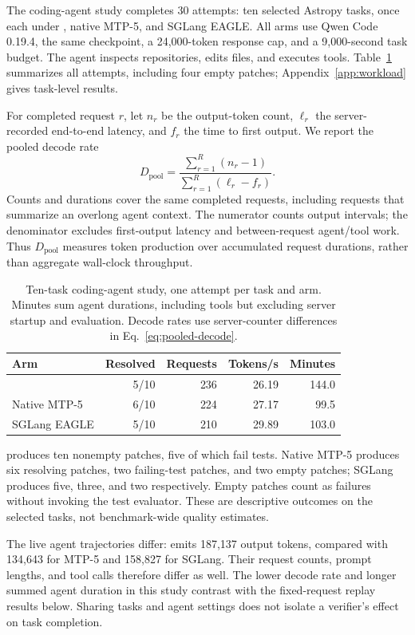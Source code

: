 The coding-agent study completes 30 attempts: ten selected Astropy tasks, once each under \sys{}, native MTP-5, and SGLang EAGLE. All arms use Qwen Code 0.19.4, the same checkpoint, a 24,000-token response cap, and a 9,000-second task budget. The agent inspects repositories, edits files, and executes tools. Table~\ref{tab:agent-study} summarizes all attempts, including four empty patches; Appendix~\ref{app:workload} gives task-level results.

For completed request $r$, let $n_r$ be the output-token count, $\ell_r$ the server-recorded end-to-end latency, and $f_r$ the time to first output. We report the pooled decode rate
\begin{equation}
 D_{\mathrm{pool}} =
 \frac{\sum_{r=1}^{R}(n_r-1)}{\sum_{r=1}^{R}(\ell_r-f_r)}.
 \label{eq:pooled-decode}
\end{equation}
Counts and durations cover the same completed requests, including requests that summarize an overlong agent context. The numerator counts output intervals; the denominator excludes first-output latency and between-request agent/tool work. Thus $D_{\mathrm{pool}}$ measures token production over accumulated request durations, rather than aggregate wall-clock throughput.

\begin{table}[t]
\caption{Ten-task coding-agent study, one attempt per task and arm. Minutes sum agent durations, including tools but excluding server startup and evaluation. Decode rates use server-counter differences in Eq.~\ref{eq:pooled-decode}.}
\label{tab:agent-study}
\centering\small
\setlength{\tabcolsep}{3pt}
\begin{tabular}{@{}lrrrr@{}}
\toprule
Arm & Resolved & Requests & Tokens/s & Minutes \\
\midrule
\sys{} & 5/10 & 236 & 26.19 & 144.0 \\
Native MTP-5 & 6/10 & 224 & 27.17 & 99.5 \\
SGLang EAGLE & 5/10 & 210 & 29.89 & 103.0 \\
\bottomrule
\end{tabular}
\end{table}

\sys{} produces ten nonempty patches, five of which fail tests. Native MTP-5 produces six resolving patches, two failing-test patches, and two empty patches; SGLang produces five, three, and two respectively. Empty patches count as failures without invoking the test evaluator. These are descriptive outcomes on the selected tasks, not benchmark-wide quality estimates.

The live agent trajectories differ: \sys{} emits 187,137 output tokens, compared with 134,643 for MTP-5 and 158,827 for SGLang. Their request counts, prompt lengths, and tool calls therefore differ as well. The lower \sys{} decode rate and longer summed agent duration in this study contrast with the fixed-request replay results below. Sharing tasks and agent settings does not isolate a verifier's effect on task completion.
